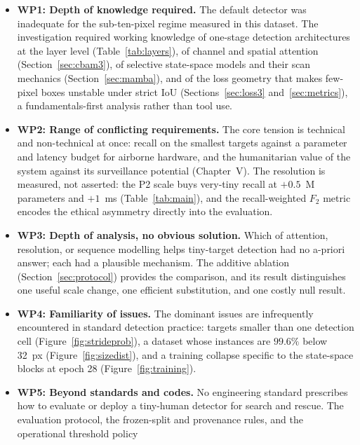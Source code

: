 \begin{itemize}
  \item \textbf{WP1: Depth of knowledge required.} The default detector was
        inadequate for the sub-ten-pixel regime measured in this dataset. The
        investigation required working knowledge of one-stage detection
        architectures at the layer level (Table~\ref{tab:layers}), of
        channel and spatial attention (Section~\ref{sec:cbam3}), of selective
        state-space models and their scan mechanics (Section~\ref{sec:mamba}), and of
        the loss geometry that makes few-pixel boxes unstable under strict
        IoU (Sections~\ref{sec:loss3} and~\ref{sec:metrics}), a fundamentals-first analysis rather
        than tool use.
  \item \textbf{WP2: Range of conflicting requirements.} The core tension is
        technical and non-technical at once: recall on the smallest targets
        against a parameter and latency budget for airborne hardware, and
        the humanitarian value of the system against its surveillance
        potential (Chapter~V). The resolution is measured, not asserted: the
        P2 scale buys very-tiny recall at $+0.5$~M parameters and $+1$~ms
        (Table~\ref{tab:main}), and the recall-weighted $F_2$ metric encodes
        the ethical asymmetry directly into the evaluation.
  \item \textbf{WP3: Depth of analysis, no obvious solution.} Which of
        attention, resolution, or sequence modelling helps tiny-target
        detection had no a-priori answer; each had a plausible mechanism. The
        additive ablation (Section~\ref{sec:protocol}) provides the comparison,
        and its result distinguishes one useful scale change, one efficient
        substitution, and one costly null result.
  \item \textbf{WP4: Familiarity of issues.} The dominant issues are
        infrequently encountered in standard detection practice: targets
        smaller than one detection cell (Figure~\ref{fig:strideprob}), a
        dataset whose instances are $99.6\%$ below 32~px
        (Figure~\ref{fig:sizedist}), and a training collapse specific to
        the state-space blocks at epoch 28 (Figure~\ref{fig:training}).
  \item \textbf{WP5: Beyond standards and codes.} No engineering standard
        prescribes how to evaluate or deploy a tiny-human detector for
        search and rescue. The evaluation protocol, the frozen-split and
        provenance rules, and the operational threshold policy

\end{itemize}
